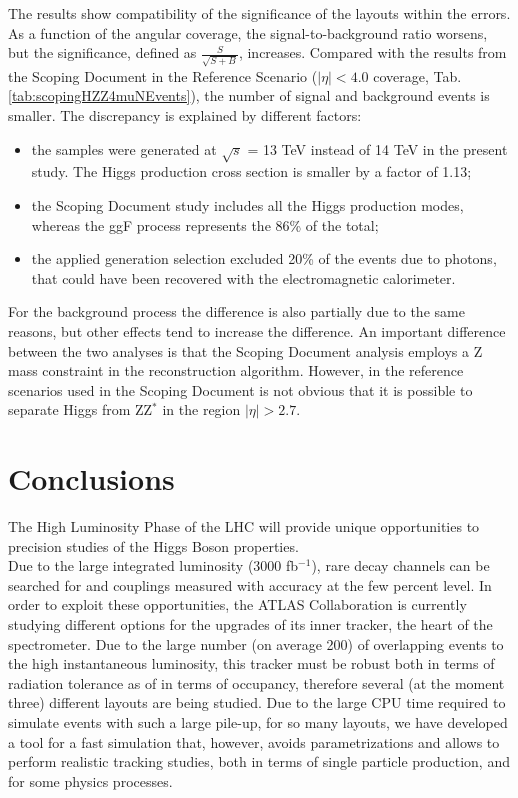 \documentclass[a4paper,twoside,12pt]{book}
\begin{document}
The results show compatibility of the significance of the layouts within the errors. As a function of the angular coverage, the 
signal-to-background ratio worsens, but the significance, defined as $\frac{S}{\sqrt{S+B}}$, increases. 
Compared with the results from the Scoping Document in the Reference Scenario 
($|\eta| < 4.0$ coverage, Tab.\ref{tab:scopingHZZ4muNEvents}), the number of
signal and background events is smaller. The discrepancy is explained by 
different factors:\\
\begin{itemize}
\item the samples were generated at $\sqrt{s}$ = 13 TeV instead of 14 TeV in the present study. The Higgs
production cross section is smaller by a factor of 1.13; 
\item the Scoping Document study includes all the Higgs production modes, whereas the ggF process represents the 86\% of 
the total;
\item the applied generation selection excluded 20\% of the events due to photons, that could have been recovered with
	the electromagnetic calorimeter.
\end{itemize} 

For the background process the difference is also partially due to the same reasons, but other effects tend to increase the difference. 
An important difference between the two analyses is that the Scoping Document analysis employs a Z mass constraint
in the reconstruction algorithm. However, in the reference scenarios used in the Scoping Document is not obvious that it is possible to separate Higgs from ZZ$^{*}$ in the region $|\eta| > 2.7$.

\clearpage
\chapter*{Conclusions}\label{sec:conclusions}

The High Luminosity Phase of the LHC will provide unique opportunities to precision studies of the Higgs Boson properties. \\

Due to the large integrated luminosity (3000 fb$^{-1}$), rare decay channels can be searched for and couplings measured with accuracy at the few percent level.
In order to exploit these opportunities, the ATLAS Collaboration is currently studying different options for the upgrades of its inner tracker, the heart of the spectrometer. Due to the large number (on average 200) of overlapping events to the high instantaneous luminosity, this tracker must be robust both in terms of radiation tolerance as of in terms of occupancy, therefore several (at the moment three) different layouts are being studied. Due to the large CPU time required to simulate events with such a large pile-up, for so many layouts, we have developed a tool for a fast simulation that, however, avoids parametrizations and allows to perform realistic tracking studies, both in terms of single particle production, and for some physics processes.\\
\end{document}
